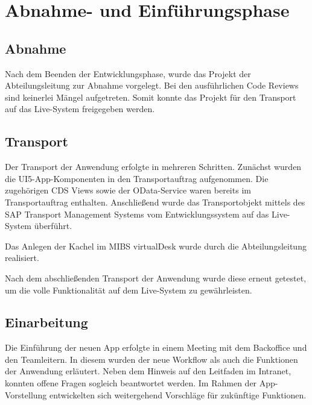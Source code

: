 \section{Abnahme- und Einführungsphase}
\label{sec:Abnahme- und Einführungsphase}

\subsection{Abnahme}
\label{sec:Abnahme}
Nach dem Beenden der Entwicklungsphase, wurde das Projekt der Abteilungsleitung zur Abnahme vorgelegt. Bei den ausführlichen Code Reviews sind keinerlei Mängel aufgetreten.
Somit konnte das Projekt für den Transport auf das Live-System freigegeben werden.

\subsection{Transport}
\label{sec:Transport}
Der Transport der Anwendung erfolgte in mehreren Schritten. Zunächst wurden die UI5-App-Komponenten in den Transportauftrag aufgenommen. Die zugehörigen CDS Views sowie der OData-Service waren bereits im Transportauftrag enthalten. Anschließend wurde das Transportobjekt mittels des SAP Transport Management Systems vom Entwicklungssystem auf das Live-System überführt.

Das Anlegen der Kachel im MIBS virtualDesk wurde durch die Abteilungsleitung realisiert.

Nach dem abschließenden Transport der Anwendung wurde diese erneut getestet, um die volle Funktionalität auf dem Live-System zu gewährleisten.

\subsection{Einarbeitung}
\label{sec:Einarbeitung}
Die Einführung der neuen App erfolgte in einem Meeting mit dem Backoffice und den Teamleitern. In diesem wurden der neue Workflow als auch die Funktionen der Anwendung erläutert. Neben dem Hinweis auf den Leitfaden im Intranet, konnten offene Fragen sogleich beantwortet werden. Im Rahmen der App-Vorstellung entwickelten sich weitergehend Vorschläge für zukünftige Funktionen.